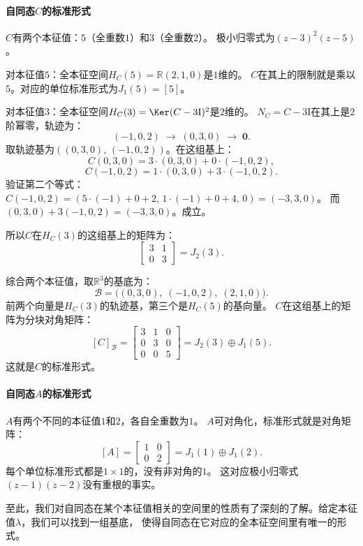 \documentclass[12pt,UTF8]{ctexbook}
\begin{document}
\paragraph{自同态$C$的标准形式}

$C$有两个本征值：$5$（全重数$1$）和$3$（全重数$2$）。
极小归零式为$(z-3)^2(z-5)$。

对本征值$5$：全本征空间$H_C(5) = \mathbb{R}(2,1,0)$是$1$维的。
$C$在其上的限制就是乘以$5$。对应的单位标准形式为$J_1(5) = [5]$。

对本征值$3$：全本征空间$H_C(3) = \Ker(C-3\mathrm{I})^2$是$2$维的。
$N_C = C - 3\mathrm{I}$在其上是$2$阶幂零，轨迹为：
$$
(-1,0,2) \;\longrightarrow\; (0,3,0) \;\longrightarrow\; \mathbf{0}.
$$
取轨迹基为$((0,3,0),\, (-1,0,2))$。在这组基上：
$$
C(0,3,0) = 3\cdot(0,3,0) + 0\cdot(-1,0,2),
$$
$$
C(-1,0,2) = 1\cdot(0,3,0) + 3\cdot(-1,0,2).
$$
验证第二个等式：$C(-1,0,2) = (5\cdot(-1)+0+2,\, 1\cdot(-1)+0+4,\, 0) = (-3, 3, 0)$。
而$(0,3,0) + 3(-1,0,2) = (-3, 3, 0)$。成立。

所以$C$在$H_C(3)$的这组基上的矩阵为：
$$
\begin{bmatrix} 3 & 1 \\ 0 & 3 \end{bmatrix} = J_2(3).
$$

综合两个本征值，取$\mathbb{R}^3$的基底为：
$$
\mathcal{B} = \big((0,3,0),\; (-1,0,2),\; (2,1,0)\big).
$$
前两个向量是$H_C(3)$的轨迹基，第三个是$H_C(5)$的基向量。
$C$在这组基上的矩阵为分块对角矩阵：
$$
[C]_{\mathcal{B}} = \begin{bmatrix} 3 & 1 & 0 \\ 0 & 3 & 0 \\ 0 & 0 & 5 \end{bmatrix} = J_2(3) \oplus J_1(5).
$$
这就是$C$的标准形式。

\paragraph{自同态$A$的标准形式}

$A$有两个不同的本征值$1$和$2$，各自全重数为$1$。
$A$可对角化，标准形式就是对角矩阵：
$$
[A] = \begin{bmatrix} 1 & 0 \\ 0 & 2 \end{bmatrix} = J_1(1) \oplus J_1(2).
$$
每个单位标准形式都是$1\times 1$的，没有非对角的$1$。
这对应极小归零式$(z-1)(z-2)$没有重根的事实。

至此，我们对自同态在某个本征值相关的空间里的性质有了深刻的了解。给定本征值$\lambda$，我们可以找到一组基底，
使得自同态在它对应的全本征空间里有唯一的形式。
\end{document}
